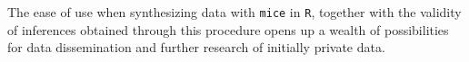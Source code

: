 \documentclass[psych,article,submit,moreauthors,pdftex]{mdpi}
\begin{document}
The ease of use when synthesizing data with \texttt{mice} in \texttt{R},
together with the validity of inferences obtained through this procedure
opens up a wealth of possibilities for data dissemination and further
research of initially private data.

%

\vspace{6pt}









\end{document}
